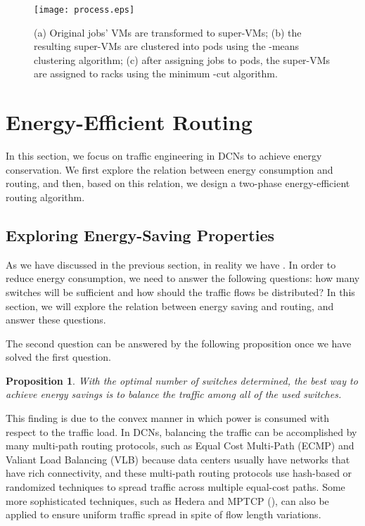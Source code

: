 \documentclass[journal,single-space,two column,twoside,10pt]{IEEEtran}
\newtheorem{proposition}{Proposition}
\begin{document}
\begin{figure}[!t]
	\centering
	\texttt{[image: process.eps]}
	\caption{(a) Original jobs' VMs are transformed to super-VMs; (b) the resulting super-VMs are clustered into pods using the -means clustering algorithm; (c) after assigning jobs to pods, the super-VMs are assigned to racks using the minimum -cut algorithm.}
	\label{fig:vma} 
\end{figure}


\section{Energy-Efficient Routing}
\label{sec:route}

In this section, we focus on traffic engineering in DCNs to achieve energy conservation. We first explore the relation between energy consumption and routing, and then, based on this relation, we design a two-phase energy-efficient routing algorithm.


\subsection{Exploring Energy-Saving Properties}

As we have discussed in the previous section, in reality we have . In order to reduce energy consumption, we need to answer the following questions: how many switches will be sufficient and how should the traffic flows be distributed? In this section, we will explore the relation between energy saving and routing, and answer these questions.

The second question can be answered by the following proposition once we have solved the first question.
\begin{proposition}
\label{prop:balance}
With the optimal number of switches determined, the best way to achieve energy savings is to balance the traffic among all of the used switches.
\end{proposition}

This finding is due to the convex manner in which power is consumed with respect to the traffic load. In DCNs, balancing the traffic can be accomplished by many multi-path routing protocols, such as Equal Cost Multi-Path (ECMP) and Valiant Load Balancing (VLB) because data centers usually have networks that have rich connectivity, and these multi-path routing protocols use hash-based or randomized techniques to spread traffic across multiple equal-cost paths. Some more sophisticated techniques, such as Hedera \cite{AL-Fares_Radhakrishnan-2010} and MPTCP (\cite{Han_Shakkottai-2006, Raiciu_Barre-2011}), can also be applied to ensure uniform traffic spread in spite of flow length variations.
\end{document}
